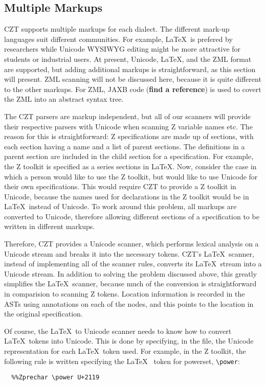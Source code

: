 \documentclass{llncs}
\begin{document}
\subsection{Multiple Markups}

 CZT supports multiple markups for each dialect.  The different
 mark-up languages suit different communities.  For example, \LaTeX\
 is prefered by researchers while Unicode WYSIWYG editing might be
 more attractive for students or industrial users. At present,
 Unicode, \LaTeX, and the ZML format \cite{UttEA:03} are supported,
 but adding additional markups is straightforward, as this section
 will present.  ZML scanning will not be discussed here, because it is
 quite different to the other markups. For ZML, JAXB code ({\bf find a
 reference}) is used to covert the ZML into an abstract syntax tree.

The CZT parsers are markup independent, but all of our scanners will
provide their respective parsers with Unicode when scanning Z variable
names etc. The reason for this is straightforward: Z specifications
are made up of sections, with each section having a name and a list of
parent sections. The definitions in a parent section are included in
the child section for a specification. For example, the Z toolkit is
specified as a series sections in \LaTeX. Now, consider the case in
which a person would like to use the Z toolkit, but would like to use
Unicode for their own specifications. This would require CZT to
provide a Z toolkit in Unicode, because the names used for
declarations in the Z toolkit would be in \LaTeX~instead of
Unicode. To work around this problem, all markups are converted to
Unicode, therefore allowing different sections of a specification to
be written in different markups.

Therefore, CZT provides a Unicode scanner, which performs lexical
analysis on a Unicode stream and breaks it into the necessary
tokens. CZT's \LaTeX~scanner, instead of implementing all of the
scanner rules, converts its \LaTeX~stream into a Unicode stream. In
addition to solving the problem discussed above, this greatly
simplifies the \LaTeX~scanner, because much of the conversion is
straightforward in comparision to scanning Z tokens. Location
information is recorded in the ASTs using annotations on each of the
nodes, and this points to the location in the original specification.

Of course, the \LaTeX~to Unicode scanner needs to know how to convert
\LaTeX~tokens into Unicode. This is done by specifying, in the file,
the Unicode representation for each \LaTeX~token used. For example, in
the Z toolkit, the following rule is written specifying the \LaTeX~
token for powerset, \verb+\power+:
\begin{verbatim}
  %%Zprechar \power U+2119
\end{verbatim}
\end{document}
